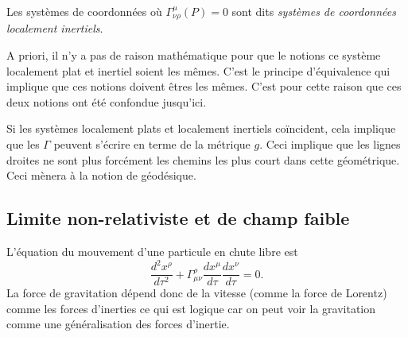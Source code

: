\documentclass[a4paper,11pt]{report}
\begin{document}
            \begin{defn}
                Les systèmes de coordonnées où $\Gamma^\mu_{\nu\rho}(P) = 0$ sont dits \textit{systèmes de coordonnées localement inertiels}.
            \end{defn}
            
            \begin{rmk}
                A priori, il n'y a pas de raison mathématique pour que le notions ce système localement plat et inertiel soient les mêmes. C'est le principe d'équivalence qui implique que ces notions doivent êtres les mêmes. C'est pour cette raison que ces deux notions ont été confondue jusqu'ici.
            \end{rmk}
            
            Si les systèmes localement plats et localement inertiels coïncident, cela implique que les $\Gamma$ peuvent s'écrire en terme de la métrique $g$. Ceci implique que les lignes droites ne sont plus forcément les chemins les plus court dans cette géométrique. Ceci mènera à la notion de géodésique.
            
        \subsection{Limite non-relativiste et de champ faible}
            
            L'équation du mouvement d'une particule en chute libre est 
            \begin{equation}
                \frac{d^2x^\rho}{d\tau^2}+\Gamma^\rho_{\mu\nu}\frac{dx^\mu}{d\tau}\frac{dx^\nu}{d\tau} = 0.
            \end{equation}
            La force de gravitation dépend donc de la vitesse (comme la force de Lorentz) comme les forces d'inerties ce qui est logique car on peut voir la gravitation comme une généralisation des forces d'inertie.\\
            
\end{document}
